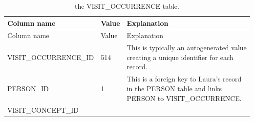 \documentclass[11pt]{book}
\theoremstyle{definition}
\theoremstyle{definition}
\theoremstyle{definition}
\theoremstyle{remark}
\begin{document}
\begin{longtable}[]{@{}lll@{}}
\caption{\label{tab:visitOccurrence} the VISIT\_OCCURRENCE table.}\tabularnewline
\toprule
\begin{minipage}[b]{0.28\columnwidth}\raggedright
Column name\strut
\end{minipage} & \begin{minipage}[b]{0.15\columnwidth}\raggedright
Value\strut
\end{minipage} & \begin{minipage}[b]{0.49\columnwidth}\raggedright
Explanation\strut
\end{minipage}\tabularnewline
\midrule
\endfirsthead
\toprule
\begin{minipage}[b]{0.28\columnwidth}\raggedright
Column name\strut
\end{minipage} & \begin{minipage}[b]{0.15\columnwidth}\raggedright
Value\strut
\end{minipage} & \begin{minipage}[b]{0.49\columnwidth}\raggedright
Explanation\strut
\end{minipage}\tabularnewline
\midrule
\endhead
\begin{minipage}[t]{0.28\columnwidth}\raggedright
VISIT\_OCCURRENCE\_ID\strut
\end{minipage} & \begin{minipage}[t]{0.15\columnwidth}\raggedright
514\strut
\end{minipage} & \begin{minipage}[t]{0.49\columnwidth}\raggedright
This is typically an autogenerated value creating a unique identifier for each record.\strut
\end{minipage}\tabularnewline
\begin{minipage}[t]{0.28\columnwidth}\raggedright
PERSON\_ID\strut
\end{minipage} & \begin{minipage}[t]{0.15\columnwidth}\raggedright
1\strut
\end{minipage} & \begin{minipage}[t]{0.49\columnwidth}\raggedright
This is a foreign key to Laura's record in the PERSON table and links PERSON to VISIT\_OCCURRENCE.\strut
\end{minipage}\tabularnewline
\begin{minipage}[t]{0.28\columnwidth}\raggedright
VISIT\_CONCEPT\_ID\strut
\end{minipage} & \begin{minipage}[t]{0.15\columnwidth}\raggedright

\end{minipage}
\end{longtable}
\end{document}
